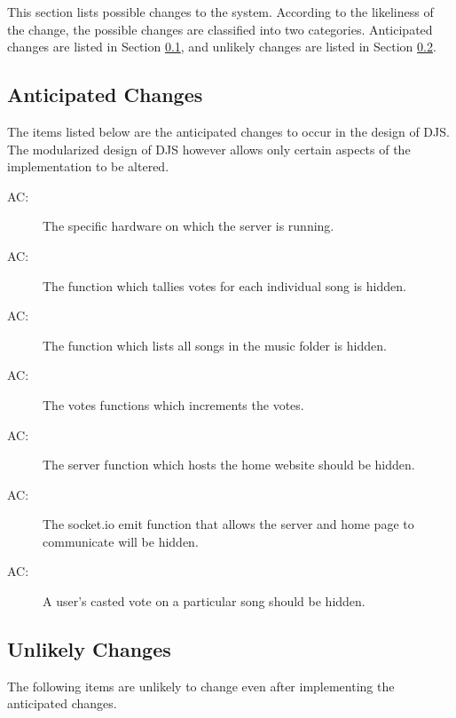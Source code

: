 \documentclass[12pt, titlepage]{article}
\newcounter{acnum}
\newcommand{\actheacnum}{AC\theacnum}
\begin{document}
This section lists possible changes to the system. According to the likeliness
of the change, the possible changes are classified into two
categories. Anticipated changes are listed in Section \ref{SecAchange}, and
unlikely changes are listed in Section \ref{SecUchange}.


\subsection{Anticipated Changes} \label{SecAchange}


The items listed below are the anticipated changes to occur in the design of DJS. The modularized design of DJS however allows only certain aspects of the implementation to be altered.


\begin{description}
\item[ \actheacnum \label{ac1}:] The specific hardware on which the server is running.
\item[ \actheacnum \label{ac2}:] The function which tallies votes for each individual song is hidden.
\item[ \actheacnum \label{ac3}:] The function which lists all songs in the music folder is hidden.
\item[ \actheacnum \label{ac4}:] The votes functions which increments the votes.
\item[ \actheacnum \label{ac5}:] The server function which hosts the home website should be hidden.
\item[ \actheacnum \label{ac6}:] The socket.io emit function that allows the server and home page to communicate will be hidden.
\item[ \actheacnum \label{ac7}:] A user's casted vote on a particular song should be hidden.
\end{description}


\subsection{Unlikely Changes} \label{SecUchange}
The following items are unlikely to change even after implementing the anticipated changes.
\end{document}
